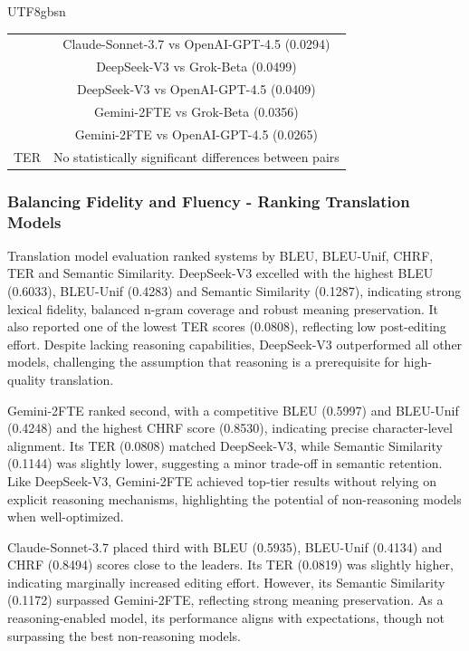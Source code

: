 \documentclass[conference]{IEEEtran}
\begin{document}
\begin{CJK*}{UTF8}{gbsn}
\begin{table}[h]
\begin{tabular}{cc}
                                             & Claude-Sonnet-3.7 vs OpenAI-GPT-4.5 (0.0294) \\
                                             & DeepSeek-V3 vs Grok-Beta (0.0499) \\
                                             & DeepSeek-V3 vs OpenAI-GPT-4.5 (0.0409) \\
                                             & Gemini-2FTE vs Grok-Beta (0.0356) \\
                                             & Gemini-2FTE vs OpenAI-GPT-4.5 (0.0265) \\
        \hline
        TER & No statistically significant differences between pairs \\
        \hline
    \end{tabular}
\end{table}


\subsubsection{Balancing Fidelity and Fluency - Ranking Translation Models}

Translation model evaluation ranked systems by BLEU, BLEU-Unif, CHRF, TER and Semantic Similarity. DeepSeek-V3 excelled with the highest BLEU (0.6033), BLEU-Unif (0.4283) and Semantic Similarity (0.1287), indicating strong lexical fidelity, balanced n-gram coverage and robust meaning preservation. It also reported one of the lowest TER scores (0.0808), reflecting low post-editing effort. Despite lacking reasoning capabilities, DeepSeek-V3 outperformed all other models, challenging the assumption that reasoning is a prerequisite for high-quality translation.

Gemini-2FTE ranked second, with a competitive BLEU (0.5997) and BLEU-Unif (0.4248) and the highest CHRF score (0.8530), indicating precise character-level alignment. Its TER (0.0808) matched DeepSeek-V3, while Semantic Similarity (0.1144) was slightly lower, suggesting a minor trade-off in semantic retention. Like DeepSeek-V3, Gemini-2FTE achieved top-tier results without relying on explicit reasoning mechanisms, highlighting the potential of non-reasoning models when well-optimized.

Claude-Sonnet-3.7 placed third with BLEU (0.5935), BLEU-Unif (0.4134) and CHRF (0.8494) scores close to the leaders. Its TER (0.0819) was slightly higher, indicating marginally increased editing effort. However, its Semantic Similarity (0.1172) surpassed Gemini-2FTE, reflecting strong meaning preservation. As a reasoning-enabled model, its performance aligns with expectations, though not surpassing the best non-reasoning models.


\end{CJK*}
\end{document}
